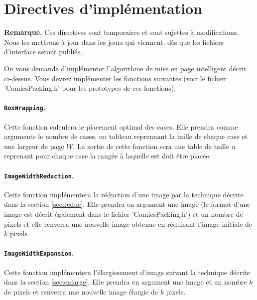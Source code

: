 \documentclass[a4paper,10pt]{article}
\begin{document}
\section{Directives d'implémentation}

{\color{red} \textbf{Remarque.} Ces directives sont temporaires et sont sujettes
à modifications. Nous les mettrons à jour dans les jours qui viennent, dès
que les fichiers d'interface seront publiés.}

On vous demande d'implémenter l'algorithme de mise en page intelligent
décrit ci-dessus. Vous devrez implémenter les fonctions suivantes
(voir le fichier 'ComicsPacking.h' pour les prototypes de ces
fonctions).

\paragraph{\texttt{BoxWrapping}.} Cette fonction calculera le placement optimal des cases. Elle prendra comme arguments le nombre de cases, un tableau reprennant la taille de chaque case et une largeur de page $W$. La sortie de cette fonction sera une table de taille $n$ reprenant pour chaque case la rangée à laquelle est doit être placée.

\paragraph{\texttt{ImageWidthReduction}.} Cette fonction implémentera la réduction d'une image par la technique décrite dans la section \ref{sec:reduc}. Elle prendra en argument une image (le format d'une image est décrit également dans le fichier 'ComicsPacking.h') et un nombre de pixels et elle renverra une nouvelle image obtenue en réduisant l'image initiale de $k$ pixels.


\paragraph{\texttt{ImageWidthExpansion}.} Cette fonction implémentera l'élargissement d'image suivant la technique décrite dans la section \ref{sec:enlarge}. Elle prendra en argument une image et un nombre $k$ de pixels et renverra une nouvelle image élargie de $k$ pixels.
\end{document}

